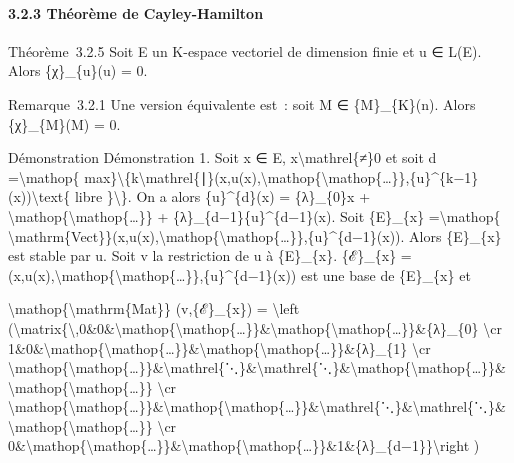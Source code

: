 \documentclass[]{article}
\begin{document}
\paragraph{3.2.3 Théorème de Cayley-Hamilton}

Théorème~3.2.5 Soit E un K-espace vectoriel de dimension finie et u ∈
L(E). Alors \{χ\}\_\{u\}(u) = 0.

Remarque~3.2.1 Une version équivalente est~: soit M ∈ \{M\}\_\{K\}(n).
Alors \{χ\}\_\{M\}(M) = 0.

Démonstration Démonstration 1. Soit x ∈ E,
x\textbackslash{}mathrel\{≠\}0 et soit d =\textbackslash{}mathop\{
max\}\textbackslash{}\{k\textbackslash{}mathrel\{∣\}(x,u(x),\textbackslash{}mathop\{\textbackslash{}mathop\{\ldots{}\}\},\{u\}\^{}\{k−1\}(x))\textbackslash{}text\{
libre \}\textbackslash{}\}. On a alors \{u\}\^{}\{d\}(x) = \{λ\}\_\{0\}x
+ \textbackslash{}mathop\{\textbackslash{}mathop\{\ldots{}\}\} +
\{λ\}\_\{d−1\}\{u\}\^{}\{d−1\}(x). Soit \{E\}\_\{x\}
=\textbackslash{}mathop\{
\textbackslash{}mathrm\{Vect\}\}(x,u(x),\textbackslash{}mathop\{\textbackslash{}mathop\{\ldots{}\}\},\{u\}\^{}\{d−1\}(x)).
Alors \{E\}\_\{x\} est stable par u. Soit v la restriction de u à
\{E\}\_\{x\}. \{ℰ\}\_\{x\} =
(x,u(x),\textbackslash{}mathop\{\textbackslash{}mathop\{\ldots{}\}\},\{u\}\^{}\{d−1\}(x))
est une base de \{E\}\_\{x\} et

\textbackslash{}mathop\{\textbackslash{}mathrm\{Mat\}\} (v,\{ℰ\}\_\{x\})
= \textbackslash{}left
(\textbackslash{}matrix\{\textbackslash{},0\&0\&\textbackslash{}mathop\{\textbackslash{}mathop\{\ldots{}\}\}\&\textbackslash{}mathop\{\textbackslash{}mathop\{\ldots{}\}\}\&\{λ\}\_\{0\}
\textbackslash{}cr
1\&0\&\textbackslash{}mathop\{\textbackslash{}mathop\{\ldots{}\}\}\&\textbackslash{}mathop\{\textbackslash{}mathop\{\ldots{}\}\}\&\{λ\}\_\{1\}
\textbackslash{}cr
\textbackslash{}mathop\{\textbackslash{}mathop\{\ldots{}\}\}\&\textbackslash{}mathrel\{⋱\}\&\textbackslash{}mathrel\{⋱\}\&\textbackslash{}mathop\{\textbackslash{}mathop\{\ldots{}\}\}\&\textbackslash{}mathop\{\textbackslash{}mathop\{\ldots{}\}\}
\textbackslash{}cr
\textbackslash{}mathop\{\textbackslash{}mathop\{\ldots{}\}\}\&\textbackslash{}mathop\{\textbackslash{}mathop\{\ldots{}\}\}\&\textbackslash{}mathrel\{⋱\}\&\textbackslash{}mathrel\{⋱\}\&\textbackslash{}mathop\{\textbackslash{}mathop\{\ldots{}\}\}
\textbackslash{}cr
0\&\textbackslash{}mathop\{\textbackslash{}mathop\{\ldots{}\}\}\&\textbackslash{}mathop\{\textbackslash{}mathop\{\ldots{}\}\}\&1\&\{λ\}\_\{d−1\}\}\textbackslash{}right
)
\end{document}

